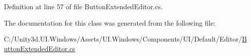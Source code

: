 Definition at line 57 of file Button\+Extended\+Editor.\+cs.



The documentation for this class was generated from the following file\+:\begin{DoxyCompactItemize}
\item 
C\+:/\+Unity3d.\+U\+I.\+Windows/\+Assets/\+U\+I.\+Windows/\+Components/\+U\+I/\+Default/\+Editor/\hyperlink{_button_extended_editor_8cs}{Button\+Extended\+Editor.\+cs}\end{DoxyCompactItemize}
